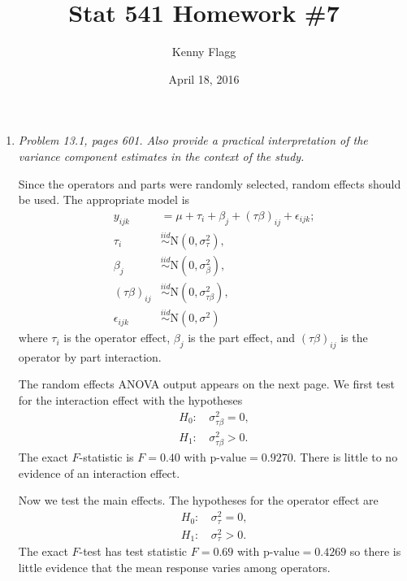 \documentclass[11pt]{article}
\title{Stat 541 Homework \#7}
\author{Kenny Flagg}
\date{April 18, 2016}
\begin{document}
\thispagestyle{plain}
\maketitle

\begin{enumerate}

\item %
{\it Problem 13.1, pages 601. Also provide a practical interpretation of the
variance component estimates in the context of the study.}



Since the operators and parts were randomly selected, random effects should
be used. The appropriate model is
\begin{align*}
y_{ijk}&=\mu+\tau_i+\beta_j+(\tau\beta)_{ij}+\epsilon_{ijk}\text{;}\\
\tau_i&\overset{iid}{\sim}\mathrm{N}\left(0,\sigma^2_\tau\right)\text{,}\\
\beta_j&\overset{iid}{\sim}\mathrm{N}\left(0,\sigma^2_\beta\right)\text{,}\\
(\tau\beta)_{ij}&\overset{iid}{\sim}
\mathrm{N}\left(0,\sigma^2_{\tau\beta}\right)\text{,}\\
\epsilon_{ijk}&\overset{iid}{\sim}\mathrm{N}\left(0,\sigma^2\right)
\end{align*}
where \(\tau_i\) is the operator effect, \(\beta_j\) is the part effect, and
\((\tau\beta)_{ij}\) is the operator by part interaction.

The random effects ANOVA output appears on the next page. We first test for
the interaction effect with the hypotheses
\begin{align*}
H_0\text{: }&\sigma^2_{\tau\beta}=0\text{,}\\
H_1\text{: }&\sigma^2_{\tau\beta}>0\text{.}
\end{align*}
The exact \(F\)-statistic is \(F=0.40\) with \(\text{p-value}=0.9270\). There
is little to no evidence of an interaction effect.

Now we test the main effects. The hypotheses for the operator effect are
\begin{align*}
H_0\text{: }&\sigma^2_{\tau}=0\text{,}\\
H_1\text{: }&\sigma^2_{\tau}>0\text{.}
\end{align*}
The exact \(F\)-test has test statistic \(F=0.69\) with
\(\text{p-value}=0.4269\) so there is little evidence that the mean response
varies among operators.


\end{enumerate}
\end{document}
